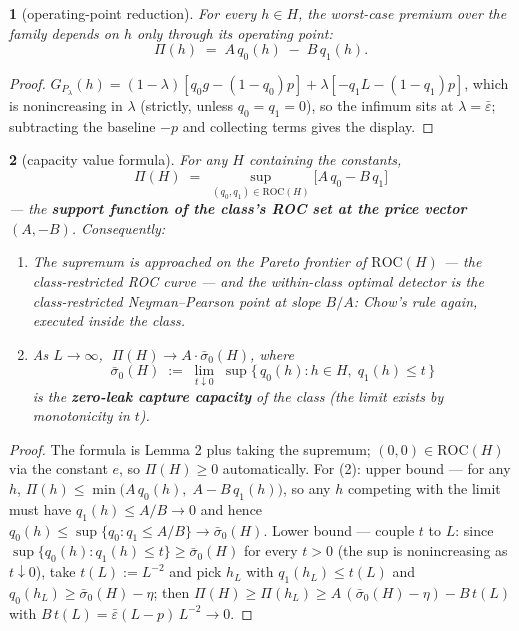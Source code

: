 \documentclass[11pt]{article}
\theoremstyle{plain}
\newtheorem*{namedthminner}{\namedthmname}
\newenvironment{nthm}[1]{\def\namedthmname{#1}\begin{namedthminner}}{\end{namedthminner}}
\theoremstyle{definition}
\begin{document}
\begin{nthm}{Lemma 2}[operating-point reduction]
For every $h \in H$, the worst-case
premium over the family depends on $h$ only through its operating point:
$$\Pi(h) \;=\; A\,q_0(h) \;-\; B\,q_1(h).$$
\end{nthm}

\begin{proof}
$G_{P_\lambda}(h) = (1-\lambda)[q_0 g - (1-q_0)p] + \lambda[-q_1 L -
(1-q_1)p]$, which is nonincreasing in $\lambda$ (strictly, unless
$q_0 = q_1 = 0$), so the infimum sits at $\lambda = \bar\varepsilon$;
subtracting the baseline $-p$ and collecting terms gives the display.
\end{proof}

\begin{nthm}{Theorem 2$'$}[capacity value formula]
For any $H$ containing the constants,
$$\Pi(H) \;=\; \sup_{(q_0, q_1) \in \mathrm{ROC}(H)} \big[ A\,q_0 - B\,q_1 \big]$$
--- the \textbf{support function of the class's ROC set at the price vector
$(A, -B)$}. Consequently:
\begin{enumerate}
\item The supremum is approached on the Pareto frontier of $\mathrm{ROC}(H)$ ---
   the class-restricted ROC curve --- and the within-class optimal detector is
   the class-restricted Neyman--Pearson point at slope $B/A$: Chow's rule
   again, executed inside the class.
\item As $L \to \infty$, $\;\Pi(H) \to A \cdot \bar\sigma_0(H)$, where
   $$\bar\sigma_0(H) \;:=\; \lim_{t \downarrow 0}\; \sup\{\, q_0(h) : h \in H,\; q_1(h) \leq t \,\}$$
   is the \textbf{zero-leak capture capacity} of the class (the limit exists by
   monotonicity in $t$).
\end{enumerate}
\end{nthm}

\begin{proof}
The formula is Lemma 2 plus taking the supremum; $(0,0) \in
\mathrm{ROC}(H)$ via the constant $e$, so $\Pi(H) \geq 0$ automatically. For
(2): upper bound --- for any $h$, $\Pi(h) \leq \min\big(A\,q_0(h),\; A -
B\,q_1(h)\big)$, so any $h$ competing with the limit must have $q_1(h) \leq
A/B \to 0$ and hence $q_0(h) \leq \sup\{q_0 : q_1 \leq A/B\} \to
\bar\sigma_0(H)$. Lower bound --- couple $t$ to $L$: since
$\sup\{q_0(h) : q_1(h) \leq t\} \geq \bar\sigma_0(H)$ for every $t > 0$ (the
sup is nonincreasing as $t \downarrow 0$), take $t(L) := L^{-2}$ and pick
$h_L$ with $q_1(h_L) \leq t(L)$ and $q_0(h_L) \geq \bar\sigma_0(H) - \eta$;
then $\Pi(H) \geq \Pi(h_L) \geq A\,(\bar\sigma_0(H) - \eta) - B\,t(L)$ with
$B\,t(L) = \bar\varepsilon(L-p)\,L^{-2} \to 0$.
\end{proof}
\end{document}
